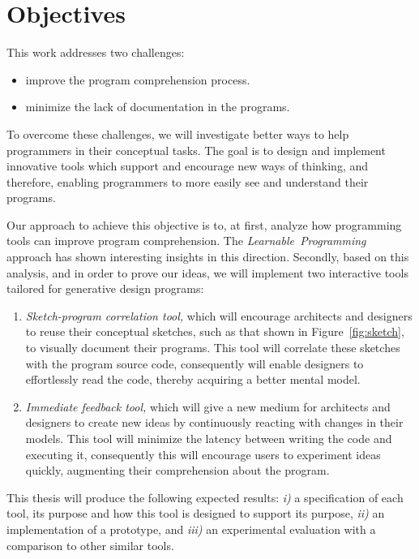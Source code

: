 
% 
% 

\section{Objectives}

This work addresses two challenges:

\begin{itemize}
\item improve the program comprehension process.
\item minimize the lack of documentation in the programs.
\end{itemize}

To overcome these challenges, we will investigate better ways to help programmers in their conceptual tasks. The goal is to design and implement innovative tools which support and encourage new ways of thinking, and therefore, enabling programmers to more easily see and understand their programs.

Our approach to achieve this objective is to, at first, analyze how programming tools can improve program comprehension. The \textit{Learnable~Programming}~\cite{learnableProg,inventingPrin} approach has shown interesting insights in this direction. Secondly, based on this analysis, and in order to prove our ideas, we will implement two interactive tools tailored for generative design programs: 

\begin{enumerate}
\item \textit{Sketch-program correlation tool,} which will encourage architects and designers to reuse their conceptual sketches, such as that shown in Figure~\ref{fig:sketch}, to visually document their programs. This tool will correlate these sketches with the program source code, consequently will enable designers to effortlessly read the code, thereby acquiring a better mental model.

\item \textit{Immediate feedback tool,} which will give a new medium for architects and designers to create new ideas by continuously reacting with changes in their models. This tool will minimize the latency between writing the code and executing it, consequently this will encourage users to experiment ideas quickly, augmenting their comprehension about the program.
\end{enumerate}

This thesis will produce the following expected results: \textit{i)} a specification of each tool, its purpose and how this tool is designed to support its purpose, \textit{ii)} an implementation of a prototype, and \textit{iii)} an experimental evaluation with a comparison to other similar tools.